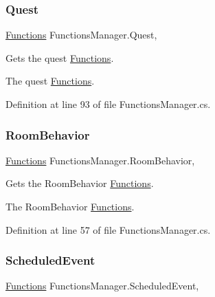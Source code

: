\subsubsection{\texorpdfstring{Quest}{Quest}}
{\footnotesize\ttfamily \hyperlink{class_functions}{Functions} Functions\+Manager.\+Quest\hspace{0.3cm}{\ttfamily [static]}, {\ttfamily [get]}}



Gets the quest \hyperlink{class_functions}{Functions}. 

The quest \hyperlink{class_functions}{Functions}.

Definition at line 93 of file Functions\+Manager.\+cs.

\mbox{\label{class_functions_manager_a2dacbb45933b4d46a50f28493e583f49}} 
\subsubsection{\texorpdfstring{Room\+Behavior}{RoomBehavior}}
{\footnotesize\ttfamily \hyperlink{class_functions}{Functions} Functions\+Manager.\+Room\+Behavior\hspace{0.3cm}{\ttfamily [static]}, {\ttfamily [get]}}



Gets the Room\+Behavior \hyperlink{class_functions}{Functions}. 

The Room\+Behavior \hyperlink{class_functions}{Functions}.

Definition at line 57 of file Functions\+Manager.\+cs.

\mbox{\label{class_functions_manager_adfc5d240b3d8924d262cf78e3747b2c3}} 
\subsubsection{\texorpdfstring{Scheduled\+Event}{ScheduledEvent}}
{\footnotesize\ttfamily \hyperlink{class_functions}{Functions} Functions\+Manager.\+Scheduled\+Event\hspace{0.3cm}{\ttfamily [static]}, {\ttfamily [get]}}



